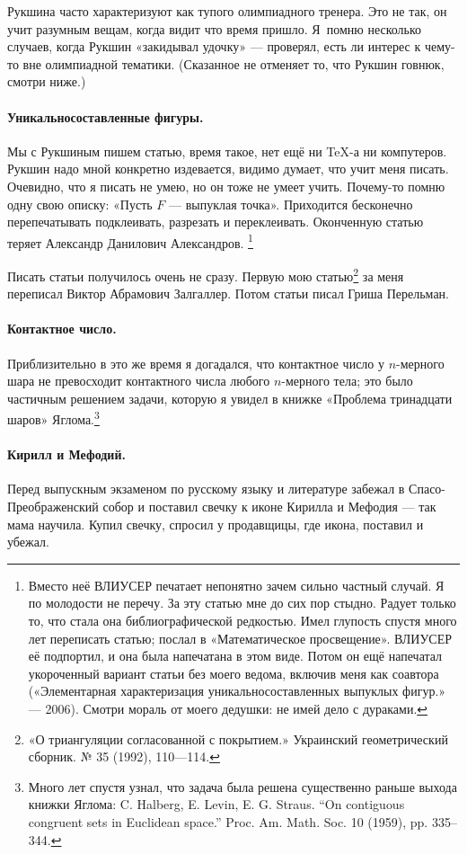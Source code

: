 \documentclass{book}
\begin{document}
Рукшина часто характеризуют как тупого олимпиадного тренера.
Это не так, он учит разумным вещам, когда видит что время пришло.
Я~помню несколько случаев, когда Рукшин «закидывал удочку» ---
проверял, есть ли интерес к чему-то вне олимпиадной тематики.
(Сказанное не отменяет то, что Рукшин говнюк, смотри ниже.)

\paragraph{Уникальносоставленные фигуры.}
Мы с Рукшиным пишем статью,
время такое, нет ещё ни TeX-а ни компутеров.
Рукшин надо мной конкретно издевается,
видимо думает, что учит меня писать.
Очевидно, что я писать не умею, но он тоже не умеет учить.
Почему-то помню одну свою описку: «Пусть $F$ --- выпуклая точка».
Приходится бесконечно перепечатывать подклеивать, разрезать и переклеивать.
Оконченную статью теряет Александр Данилович Александров.%
\footnote{Вместо неё ВЛИУСЕР печатает непонятно зачем сильно частный случай.
Я по молодости не перечу.
За эту статью мне до сих пор стыдно. 
Радует только то, что стала она библиографической редкостью.
Имел глупость спустя много лет переписать статью; послал в «Математическое просвещение».
ВЛИУСЕР её подпортил, и она была напечатана в этом виде.
Потом он ещё напечатал укороченный вариант статьи без моего ведома, включив меня как соавтора («Элементарная характеризация уникальносоставленных выпуклых фигур.» --- 2006).
Смотри мораль от моего дедушки: не имей дело с дураками.}

Писать статьи получилось очень не сразу.
Первую мою статью\footnote{«О триангуляции согласованной с покрытием.» Украинский геометрический сборник.
№ 35 (1992), 110---114.} за меня переписал Виктор Абрамович Залгаллер.
Потом статьи писал Гриша Перельман.

\paragraph{Контактное число.}
Приблизительно в это же время я догадался, что контактное число у $n$-мерного шара не превосходит контактного числа любого $n$-мерного тела;
это было частичным решением задачи, которую я увидел в книжке «Проблема тринадцати шаров» Яглома.\footnote{Много лет спустя узнал, что задача была решена существенно раньше выхода книжки Яглома: C.
Halberg, E.
Levin, E.
G.
Straus.
“On contiguous congruent sets in Euclidean space.” Proc.
Am.
Math.
Soc.
10 (1959), pp.
335--344.}


\paragraph{Кирилл и Мефодий.}
Перед выпускным экзаменом по русскому языку и литературе забежал в Спасо-Преображенский собор и поставил свечку к иконе Кирилла и Мефодия --- так мама научила.
Купил свечку, спросил у продавщицы, где икона, поставил и убежал.
\end{document}

